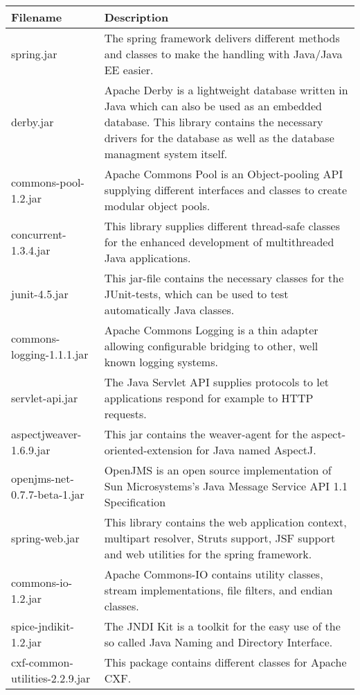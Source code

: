 \begin{center}
\begin{longtable}{|p{}|p{}|}
\hline 
Filename & Description\\
\hline
\hline 
spring.jar & The spring framework delivers different methods and classes to make the handling with Java/Java EE easier.\\
\hline 
derby.jar & Apache Derby is a lightweight database written in Java which can also be used as an embedded database. This library contains the necessary drivers for the database as well as the database managment system itself.\\
\hline 
commons-pool-1.2.jar & Apache Commons Pool is an Object-pooling API supplying different interfaces and classes to create modular object pools.\\
\hline 
concurrent-1.3.4.jar & This library supplies different thread-safe classes for the enhanced development of multithreaded Java applications.\\
\hline 
junit-4.5.jar & This jar-file contains the necessary classes for the JUnit-tests, which can be used to test automatically Java classes.\\
\hline 
commons-logging-1.1.1.jar & Apache Commons Logging is a thin adapter allowing configurable bridging to other, well known logging systems.\\
\hline 
servlet-api.jar & The Java Servlet API supplies protocols to let applications respond for example to HTTP requests.\\
\hline 
aspectjweaver-1.6.9.jar & This jar contains the weaver-agent for the aspect-oriented-extension for Java named AspectJ.\\
\hline 
openjms-net-0.7.7-beta-1.jar & OpenJMS is an open source implementation of Sun Microsystems's Java Message Service API 1.1 Specification\\
\hline 
spring-web.jar & This library contains the web application context, multipart resolver, Struts support, JSF support and web utilities for the spring framework.\\
\hline 
commons-io-1.2.jar & Apache Commons-IO contains utility classes, stream implementations, file filters, and endian classes.\\
\hline 
spice-jndikit-1.2.jar & The JNDI Kit is a toolkit for the easy use of the so called Java Naming and Directory Interface.\\
\hline 
cxf-common-utilities-2.2.9.jar & This package contains different classes for Apache CXF.\\

\end{longtable}
\end{center}
